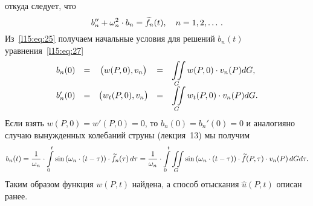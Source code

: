 откуда следует, что 
\begin{equation}\label{l15:eq:27}
	\hfill b_n''+\omega_n^2\cdot b_n=\widetilde{f}_n(t),\quad n=1,2,\ldots\,.\hfill
\end{equation}
Из~\eqref{l15:eq:25} получаем начальные условия для решений $b_n(t)$ уравнения~\eqref{l15:eq:27}
\begin{equation*}
	\hfill\begin{array}{rcccl}
		b_n(0)&=&\big(w(P,0),v_n\big)&=&\displaystyle\iint\limits_{G}w(P,0)\cdot v_n(P)dG,\\
		b'_n(0)&=&\big(w_t(P,0),v_n\big)&=&\displaystyle\iint\limits_{G}w_t(P,0)\cdot v_n(P)dG.
	\end{array}\hfill
\end{equation*}
Если взять $w(P,0)=w'(P,0)=0$, то $b_n(0)=b_n'(0)=0$ и аналогияно случаю вынужденных колебаний струны (лекция~13) мы получим 
\begin{equation*}
	\hfill b_n(t)=\frac{1}{\omega_n}\cdot\int\limits_0^t\sin\left(\omega_n\cdot(t-\tau)\right)\cdot\widetilde{f}_n(\tau)\,d\tau=\frac{1}{\omega_n}\cdot\int\limits_0^t\iint\limits_{G}\sin\left(\omega_n\cdot(t-\tau)\right)\cdot\widetilde{f}(P,\tau)\cdot v_n(P)\,dGd\tau.\hfill
\end{equation*}
Таким образом функция $w(P,t)$ найдена, а способ отыскания $\widehat{u}(P,t)$ описан ранее.